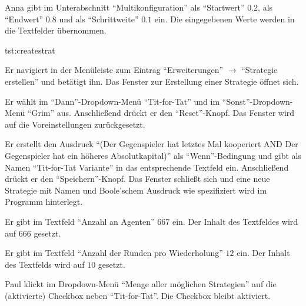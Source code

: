 \documentclass[parskip=full,11pt]{scrartcl}
\begin{document}
{Anna gibt im Unterabschnitt \enquote{Multikonfiguration} als \enquote{Startwert} \(0.2\), als \enquote{Endwert} \(0.8\) und als \enquote{Schrittweite} \(0.1\) ein.}
{Die eingegebenen Werte werden in die Textfelder übernommen.}

{tst:createstrat}

{Er navigiert in der Menüleiste zum Eintrag \enquote{Erweiterungen} \(\rightarrow\) \enquote{\Gls{Strategie} erstellen} und betätigt ihn.}
{Das Fenster zur Erstellung einer \Gls{Strategie} öffnet sich.}

{Er wählt im \enquote{Dann}-Dropdown-Menü \enquote{Tit-for-Tat} und im \enquote{Sonst}-Dropdown-Menü \enquote{Grim} aus. Anschließend drückt er den \enquote{Reset}-Knopf.}
{Das Fenster wird auf die Voreinstellungen zurückgesetzt.}

{Er erstellt den Ausdruck \enquote{(Der Gegenspieler hat letztes Mal kooperiert AND Der Gegenspieler hat ein höheres Absolutkapital)} als \enquote{Wenn}-Bedingung und gibt als Namen \enquote{Tit-for-Tat Variante} in das entsprechende Textfeld ein. Anschließend drückt er den \enquote{Speichern}-Knopf.}
{Das Fenster schließt sich und eine neue \Gls{Strategie} mit Namen und Boole'schem Ausdruck wie spezifiziert wird im Programm hinterlegt.}


{Er gibt im Textfeld \enquote{Anzahl an Agenten} \(667\) ein.}
{Der Inhalt des Textfeldes wird auf \(666\) gesetzt.}

{Er gibt im Textfeld \enquote{Anzahl der Runden pro Wiederholung} \(12\) ein.}
{Der Inhalt des Textfelds wird auf \(10\) gesetzt.}

{Paul klickt im Dropdown-Menü \enquote{Menge aller möglichen Strategien} auf die (aktivierte) Checkbox neben \enquote{Tit-for-Tat}.}
{Die Checkbox bleibt aktiviert.}
\end{document}
